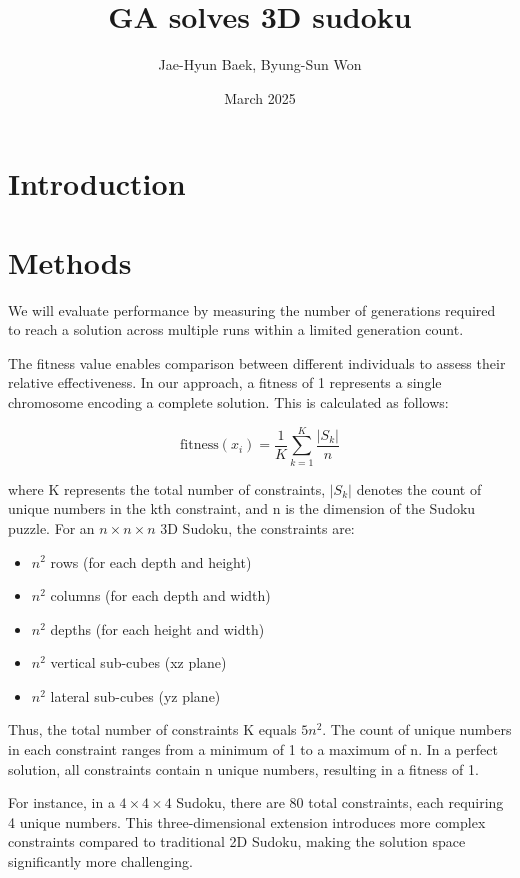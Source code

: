 \documentclass{article}
\title{GA solves 3D sudoku}
\author{Jae-Hyun Baek, Byung-Sun Won}
\date{March 2025}
\begin{document}
\maketitle

\section{Introduction}

\section{Methods}

We will evaluate performance by measuring the number of generations required to reach a solution across multiple runs within a limited generation count.

The fitness value enables comparison between different individuals to assess their relative effectiveness. In our approach, a fitness of 1 represents a single chromosome encoding a complete solution. This is calculated as follows:

\begin{equation}
\text{fitness}(x_i) = \frac{1}{K}\sum_{k=1}^K \frac{|S_k|}{n}
\end{equation}

where K represents the total number of constraints, $|S_k|$ denotes the count of unique numbers in the kth constraint, and n is the dimension of the Sudoku puzzle. For an $n \times n \times n$ 3D Sudoku, the constraints are:

\begin{itemize}
\item $n^2$ rows (for each depth and height)
\item $n^2$ columns (for each depth and width) 
\item $n^2$ depths (for each height and width)
\item $n^2$ vertical sub-cubes (xz plane)
\item $n^2$ lateral sub-cubes (yz plane)
\end{itemize}

Thus, the total number of constraints K equals $5n^2$. The count of unique numbers in each constraint ranges from a minimum of 1 to a maximum of n. In a perfect solution, all constraints contain n unique numbers, resulting in a fitness of 1.

For instance, in a $4 \times 4 \times 4$ Sudoku, there are 80 total constraints, each requiring 4 unique numbers. This three-dimensional extension introduces more complex constraints compared to traditional 2D Sudoku, making the solution space significantly more challenging.
\end{document}
